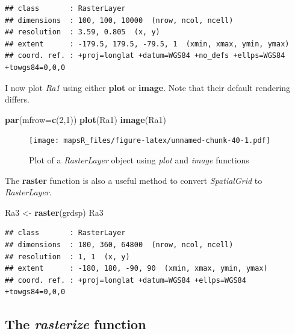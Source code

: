 \documentclass[]{report}
\newenvironment{Shaded}{\begin{snugshade}}{\end{snugshade}}
\newcommand{\DataTypeTok}[1]{\textcolor[rgb]{0.13,0.29,0.53}{#1}}
\newcommand{\DecValTok}[1]{\textcolor[rgb]{0.00,0.00,0.81}{#1}}
\newcommand{\KeywordTok}[1]{\textcolor[rgb]{0.13,0.29,0.53}{\textbf{#1}}}
\newcommand{\NormalTok}[1]{#1}
\newcommand{\StringTok}[1]{\textcolor[rgb]{0.31,0.60,0.02}{#1}}
\begin{document}
\begin{verbatim}
## class       : RasterLayer 
## dimensions  : 100, 100, 10000  (nrow, ncol, ncell)
## resolution  : 3.59, 0.805  (x, y)
## extent      : -179.5, 179.5, -79.5, 1  (xmin, xmax, ymin, ymax)
## coord. ref. : +proj=longlat +datum=WGS84 +no_defs +ellps=WGS84 +towgs84=0,0,0
\end{verbatim}

I now plot \emph{Ra1} using either \textbf{plot} or \textbf{image}. Note
that their default rendering differs.

\begin{Shaded}
\begin{Highlighting}[]
\KeywordTok{par}\NormalTok{(}\DataTypeTok{mfrow=}\KeywordTok{c}\NormalTok{(}\DecValTok{2}\NormalTok{,}\DecValTok{1}\NormalTok{))}
\KeywordTok{plot}\NormalTok{(Ra1)}
\KeywordTok{image}\NormalTok{(Ra1)}
\end{Highlighting}
\end{Shaded}

\begin{figure}
\centering
\texttt{[image: mapsR\_files/figure-latex/unnamed-chunk-40-1.pdf]}
\caption{Plot of a \emph{RasterLayer} object using \emph{plot} and
\emph{image} functions}
\end{figure}

The \textbf{raster} function is also a useful method to convert
\emph{SpatialGrid} to \emph{RasterLayer}.

\begin{Shaded}
\begin{Highlighting}[]
\NormalTok{Ra3 <-}\StringTok{ }\KeywordTok{raster}\NormalTok{(grdsp)}
\NormalTok{Ra3}
\end{Highlighting}
\end{Shaded}

\begin{verbatim}
## class       : RasterLayer 
## dimensions  : 180, 360, 64800  (nrow, ncol, ncell)
## resolution  : 1, 1  (x, y)
## extent      : -180, 180, -90, 90  (xmin, xmax, ymin, ymax)
## coord. ref. : +proj=longlat +datum=WGS84 +ellps=WGS84 +towgs84=0,0,0
\end{verbatim}

\hypertarget{the-rasterize-function}{%
\subsection{\texorpdfstring{The \emph{rasterize}
function}{The rasterize function}}\label{the-rasterize-function}}
\end{document}
